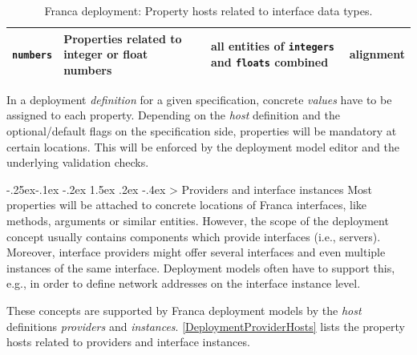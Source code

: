 \documentclass[a4paper,10pt]{scrreprt}
\makeatletter
\renewcommand\subsection{\medskip\@startsection{subsection}{2}{\z@}%
  {-.25ex\@plus -.1ex \@minus -.2ex}%
  {1.5ex \@plus .2ex \@minus -.4ex}%
  {\ifnum \scr@compatibility>\@nameuse{scr@v@2.96}\relax
    \setlength{\parfillskip}{\z@ plus 1fil}\fi
    \raggedsection\normalfont\sectfont\nobreak\size@subsection
  }%
}
\newlength{\XdocTEffectiveWidth}
\makeatother
\begin{document}
\begin{table}
\begin{tabular}{p{0.13\XdocTEffectiveWidth}p{0.38\XdocTEffectiveWidth}p{0.25\XdocTEffectiveWidth}p{0.25\XdocTEffectiveWidth}}
\\
\protect\lstinline[language=FDeploy]�numbers�

 & Properties related to integer or float numbers

 & all entities of \protect\lstinline[language=FDeploy]�integers� and \protect\lstinline[language=FDeploy]�floats� combined

 & alignment

\\
\bottomrule
\end{tabular}
\caption{Franca deployment: Property hosts related to interface data types.}
\label{DeploymentInterfaceHostsPart2}
\end{table}

In a deployment \textit{definition} for a given specification, concrete \textit{values} 
have to be assigned to each property. Depending on the \textit{host} definition and the
optional/default flags on the specification side, properties will be mandatory at
certain locations. This will be enforced by the deployment model editor and 
the underlying validation checks.

\subsection{Providers and interface instances}
\label{DeploymentModels_Concepts_Providers}
Most properties will be attached to concrete locations of Franca interfaces,
like methods, arguments or similar entities. However, the scope of the deployment concept
usually contains components which provide interfaces (i.e., servers). Moreover,
interface providers might offer several interfaces and even multiple instances of
the same interface. Deployment models often have to support this, e.g., in order to
define network addresses on the interface instance level. 

These concepts are supported by Franca deployment models by the \textit{host} definitions
\textit{providers} and \textit{instances}.
\autoref{DeploymentProviderHosts} lists the property hosts
related to providers and interface instances.
\end{document}
